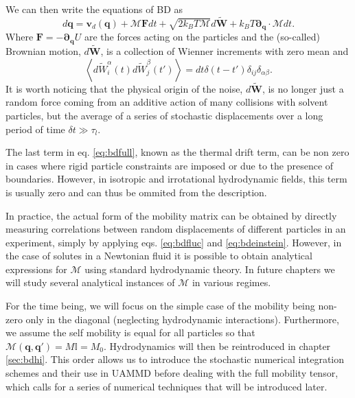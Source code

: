 \documentclass[ twoside,openright,titlepage,numbers=noenddot,%
headinclude,footinclude,cleardoublepage=empty,abstract=on,
BCOR=5mm,paper=a4,fontsize=11pt, dvipsnames
]{scrreprt}
\renewcommand{\vec}[1]{\bm{#1}}
\newcommand{\tens}[1]{\bm{\mathcal{#1}}}
\newcommand{\uammd}{\gls{UAMMD}\xspace}
\newcommand{\dt}{\delta t}
\newcommand{\kT}{k_B T}
\newcommand{\noise}{\widetilde{W}}
\newcommand{\ppos}{q}
\begin{document}
We can then write the equations of \gls{BD} as
\begin{equation}
  \label{eq:bdfull}
  d\vec{\ppos} = \vec{v}_d(\vec{\ppos}) + \tens{M}\vec{F}dt + \sqrt{2\kT\tens{M}}d\vec{\noise} + \kT\vec{\partial}_{\vec{\ppos}}\cdot\tens{M}dt.
\end{equation}
Where $\vec{F} = -\vec{\partial}_{\vec{\ppos}}U$ are the forces acting on the particles and the (so-called) Brownian motion, $d\vec{\noise}$, is a collection of Wienner increments with zero mean and
\begin{equation}
\left\langle d\noise_{i}^\alpha(t)d\noise_{j}^\beta(t') \right\rangle = dt\delta(t-t')\delta_{ij}\delta_{\alpha\beta}.
\end{equation}
It is worth noticing that the physical origin of the noise, $d\vec{\noise}$, is no longer just a random force coming from an additive action of many collisions with solvent particles, but the average of a series of stochastic displacements over a long period of time $\dt \gg \tau_l$.

The last term in eq. \eqref{eq:bdfull}, known as the thermal drift term, can be non zero in cases where rigid particle constraints are imposed\cite{Westwood2021} or due to the presence of boundaries\cite{Pelaez2018,Aleks,Buscalioni}. However, in isotropic and irrotational hydrodynamic fields, this term is usually zero and can thus be ommited from the description.

In practice, the actual form of the mobility matrix can be obtained by directly measuring correlations between random displacements of different particles\cite{Panzuela2018} in an experiment, simply by applying eqs. \eqref{eq:bdfluc} and \eqref{eq:bdeinstein}. However, in the case of solutes in a Newtonian fluid it is possible to obtain analytical expressions for $\tens{M}$ using standard hydrodynamic theory. In future chapters we will study several analytical instances of $\tens{M}$ in various regimes.

For the time being, we will focus on the simple case of the mobility being non-zero only in the diagonal (neglecting hydrodynamic interactions). Furthermore, we assume the self mobility is equal for all particles so that $\tens{M}(\vec{\ppos}, \vec{\ppos}') = M\mathbb{I} = M_0$. Hydrodynamics will then be reintroduced in chapter \ref{sec:bdhi}. This order allows us to introduce the stochastic numerical integration schemes and their use in \uammd before dealing with the full mobility tensor, which calls for a series of numerical techniques that will be introduced later.
\end{document}
